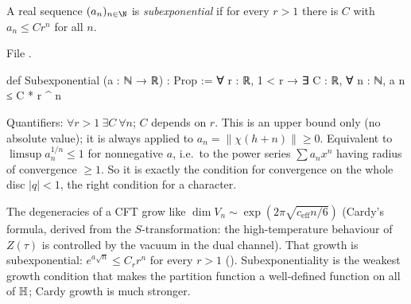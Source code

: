 \begin{definition}\label{l14:def:subexp}
A real sequence $(a_n)_{n\in\N}$ is \emph{subexponential} if for every $r>1$ there is $C$ with $a_n\le Cr^n$ for all $n$.
\end{definition}
\noindent File .
\begin{leancode}
def Subexponential (a : ℕ → ℝ) : Prop :=
  ∀ r : ℝ, 1 < r → ∃ C : ℝ, ∀ n : ℕ, a n ≤ C * r ^ n
\end{leancode}
\begin{dictionary}
Quantifiers: $\forall r>1\ \exists C\ \forall n$; $C$ depends on $r$. This is an upper bound only (no absolute value); it is
always applied to $a_n = \|\chi(h+n)\|\ge0$. Equivalent to $\limsup a_n^{1/n}\le1$ for nonnegative $a$, i.e.\ to the power
series $\sum a_nx^n$ having radius of convergence $\ge1$. So it is exactly the condition for convergence on the whole disc
$|q|<1$, the right condition for a character.
\end{dictionary}
\begin{physics}
The degeneracies of a CFT grow like $\dim V_n\sim\exp(2\pi\sqrt{c_{\mathrm{eff}}n/6})$ (Cardy's formula, derived from the
$S$-transformation: the high-temperature behaviour of $Z(\tau)$ is controlled by the vacuum in the dual channel). That growth
is subexponential: $e^{a\sqrt n}\le C_r r^n$ for every $r>1$ (). Subexponentiality is the
weakest growth condition that makes the partition function a well-defined function on all of $\mathbb{H}$; Cardy growth is
much stronger.
\end{physics}

